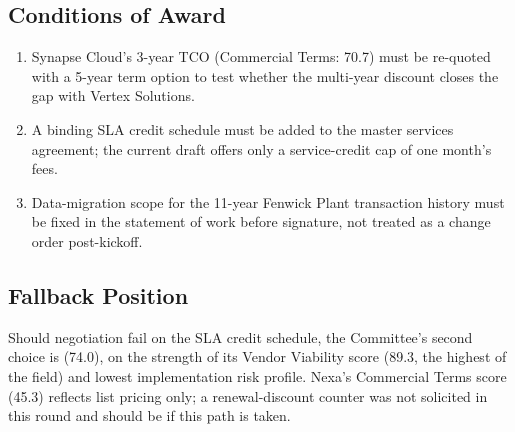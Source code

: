 \noindent
\begin{minipage}[t]{0.48\textwidth}
\subsection*{\color{primary}Conditions of Award}
\begin{enumerate}[leftmargin=1.4em, itemsep=3pt]
  \item Synapse Cloud's 3-year TCO (Commercial Terms: 70.7) must be re-quoted with a 5-year
    term option to test whether the multi-year discount closes the gap with Vertex Solutions.
  \item A binding SLA credit schedule must be added to the master services agreement; the
    current draft offers only a service-credit cap of one month's fees.
  \item Data-migration scope for the 11-year Fenwick Plant transaction history must be fixed in
    the statement of work before signature, not treated as a change order post-kickoff.
\end{enumerate}

\subsection*{\color{primary}Fallback Position}
Should negotiation fail on the SLA credit schedule, the Committee's second choice is
 (74.0), on the strength of its Vendor Viability score
(89.3, the highest of the field) and lowest implementation risk profile. Nexa's Commercial
Terms score (45.3) reflects list pricing only; a renewal-discount counter was not solicited in
this round and should be if this path is taken.
\end{minipage}%
\hfill
